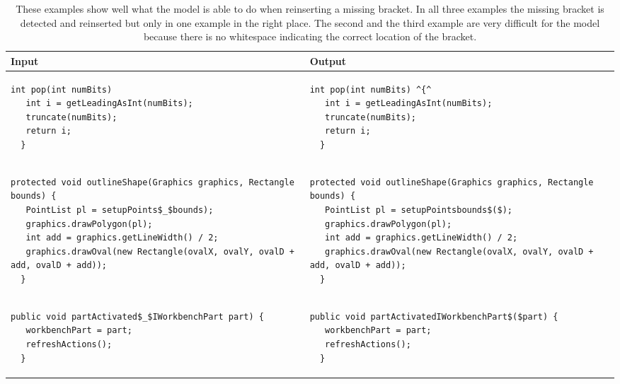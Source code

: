 \begin{landscape}
\begin{table}[p]
\begin{tabular}{ | m{10cm} | m{10cm} | }
  \hline
  Input & Output \\
  \hline
  {\begin{lstlisting}[style=table]
  int pop(int numBits)
   int i = getLeadingAsInt(numBits);
   truncate(numBits);
   return i;
  }
  \end{lstlisting}} &
  {\begin{lstlisting}[style=table]
  int pop(int numBits) ^{^
   int i = getLeadingAsInt(numBits);
   truncate(numBits);
   return i;
  }
  \end{lstlisting}} \\
  \hline
  {\begin{lstlisting}[style=table]
  protected void outlineShape(Graphics graphics, Rectangle bounds) {
   PointList pl = setupPoints$_$bounds);
   graphics.drawPolygon(pl);
   int add = graphics.getLineWidth() / 2;
   graphics.drawOval(new Rectangle(ovalX, ovalY, ovalD + add, ovalD + add));
  }
  \end{lstlisting}} &
  {\begin{lstlisting}[style=table]
  protected void outlineShape(Graphics graphics, Rectangle bounds) {
   PointList pl = setupPointsbounds$($);
   graphics.drawPolygon(pl);
   int add = graphics.getLineWidth() / 2;
   graphics.drawOval(new Rectangle(ovalX, ovalY, ovalD + add, ovalD + add));
  }
  \end{lstlisting}} \\
  \hline
  {\begin{lstlisting}[style=table]
  public void partActivated$_$IWorkbenchPart part) {
   workbenchPart = part;
   refreshActions();
  }
  \end{lstlisting}} &
  {\begin{lstlisting}[style=table]
  public void partActivatedIWorkbenchPart$($part) {
   workbenchPart = part;
   refreshActions();
  }
  \end{lstlisting}} \\
  \hline
\end{tabular}
\caption{These examples show well what the model is able to do when reinserting a missing bracket. In all three examples the missing bracket is detected and reinserted but only in one example in the right place. The second and the third example are very difficult for the model because there is no whitespace indicating the correct location of the bracket.}
\label{brackets_showcase_table}
\end{table}


\end{landscape}
